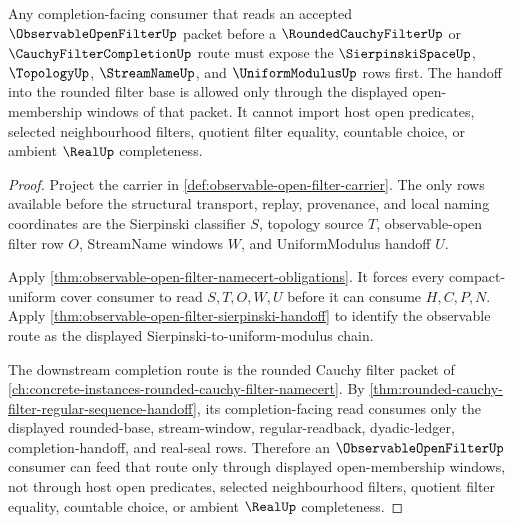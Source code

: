 \begin{theorem}
\label{thm:observable-open-filter-rounded-cauchy-consumption}
Any completion-facing consumer that reads an accepted $\ObservableOpenFilterUp$ packet before a $\RoundedCauchyFilterUp$ or $\CauchyFilterCompletionUp$ route must expose the $\SierpinskiSpaceUp$, $\TopologyUp$, $\StreamNameUp$, and $\UniformModulusUp$ rows first. The handoff into the rounded filter base is allowed only through the displayed open-membership windows of that packet. It cannot import host open predicates, selected neighbourhood filters, quotient filter equality, countable choice, or ambient $\RealUp$ completeness.
\end{theorem}
\begin{proof}
Project the carrier in \autoref{def:observable-open-filter-carrier}. The only rows available before the structural transport, replay, provenance, and local naming coordinates are the Sierpinski classifier $S$, topology source $T$, observable-open filter row $O$, StreamName windows $W$, and UniformModulus handoff $U$.

Apply \autoref{thm:observable-open-filter-namecert-obligations}. It forces every compact-uniform cover consumer to read $S,T,O,W,U$ before it can consume $H,C,P,N$. Apply \autoref{thm:observable-open-filter-sierpinski-handoff} to identify the observable route as the displayed Sierpinski-to-uniform-modulus chain.

The downstream completion route is the rounded Cauchy filter packet of \autoref{ch:concrete-instances-rounded-cauchy-filter-namecert}. By \autoref{thm:rounded-cauchy-filter-regular-sequence-handoff}, its completion-facing read consumes only the displayed rounded-base, stream-window, regular-readback, dyadic-ledger, completion-handoff, and real-seal rows. Therefore an $\ObservableOpenFilterUp$ consumer can feed that route only through displayed open-membership windows, not through host open predicates, selected neighbourhood filters, quotient filter equality, countable choice, or ambient $\RealUp$ completeness.
\end{proof}


